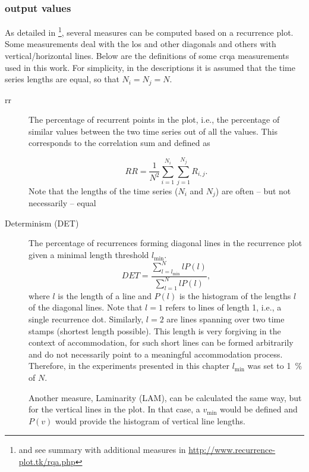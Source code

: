 \subsubsection{output values}
\label{subsubsec:output_values}

As detailed in \citet{Marwan2007recurrence}\footnote{and see summary with additional measures in \url{http://www.recurrence-plot.tk/rqa.php}}, several measures can be computed based on a recurrence plot.
Some measurements deal with the \ac{los} and other diagonals and others with vertical/horizontal lines.
Below are the definitions of some \ac{crqa} measurements used in this work.
For simplicity, in the descriptions it is assumed that the time series lengths are equal, so that $N_i=N_j=N$.

\begin{description}
	\item[\Acf{rr}] The percentage of recurrent points in the plot, i.e., the percentage of similar values between the two time series out of all the values.
	This corresponds to the correlation sum and defined as
	
	\begin{equation}
		\label{eq:rr}
		RR = \frac{1}{N^2} \sum_{i=1}^{N_i} \sum_{j=1}^{N_j} R_{i,j}.
	\end{equation}
	Note that the lengths of the time series ($N_i$ and $N_j$) are often -- but not necessarily -- equal
		
	\item[Determinism (DET)] The percentage of recurrences forming diagonal lines in the recurrence plot given a minimal length threshold $l_{\min}$.
	\begin{equation}
		\label{eq:det}
		DET = \frac{\sum_{l=l_{\min}}^{N} l P(l)}{\sum_{l=1}^N l P(l)},
	\end{equation}
	where $l$ is the length of a line and $P(l)$ is the histogram of the lengths $l$ of the diagonal lines.
	Note that $l=1$ refers to lines of length 1, i.e., a single recurrence dot.	
	Similarly, $l=2$ are lines spanning over two time stamps (shortest length possible).
	This length is very forgiving in the context of accommodation, for such short lines can be formed arbitrarily and do not necessarily point to a meaningful accommodation process.
	Therefore, in the experiments presented in this chapter $l_{\min}$ was set to \SI{1}{\percent} of $N$.
	
	Another measure, Laminarity (LAM), can be calculated the same way, but for the vertical lines in the plot.
	In that case, a $v_{\min}$ would be defined and $P(v)$ would provide the histogram of vertical line lengths.
	

\end{description}

